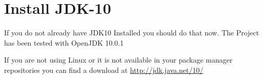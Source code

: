 \section{Install JDK-10}

If you do not already have JDK10 Installed you should do that now.
The Project has been tested with OpenJDK 10.0.1

If you are not using Linux or it is not available in your package manager repositories
you can find a download at \url{http://jdk.java.net/10/}
